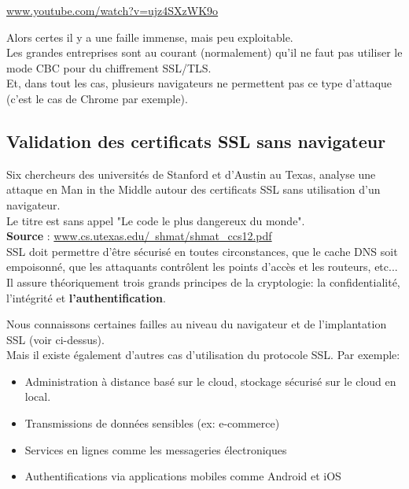 \documentclass{article}
\begin{document}
	\href{http://www.youtube.com/watch?v=ujz4SXzWK9o}
	{www.youtube.com/watch?v=ujz4SXzWK9o}
	
	Alors certes il y a une faille immense, mais peu exploitable.\\
	Les grandes entreprises sont au courant (normalement) qu'il ne faut
	pas utiliser le mode CBC pour du chiffrement SSL/TLS.\\
	Et, dans tout les cas, plusieurs navigateurs ne permettent pas ce
	type d'attaque (c'est le cas de Chrome par exemple).\\
	
	
	
	\subsection{Validation des certificats SSL sans navigateur}	
	
	Six chercheurs des universités de Stanford et d'Austin au Texas, 
	analyse une attaque en Man in the Middle autour des certificats
	SSL sans utilisation d'un navigateur.\\
	
	Le titre est sans appel "Le code le plus dangereux du monde".\\
	
	\textbf{Source} :
	\href{http://www.cs.utexas.edu/~shmat/shmat_ccs12.pdf}
	{www.cs.utexas.edu/~shmat/shmat\_ccs12.pdf}\\
	
	SSL doit permettre d'être sécurisé en toutes circonstances, que le
	cache DNS soit empoisonné, que les attaquants contrôlent les
	points d'accès et les routeurs, etc...\\
	
	Il assure théoriquement trois grands principes de la
	cryptologie: la confidentialité, l'intégrité et
	\textbf{l'authentification}.

	Nous connaissons certaines failles au niveau du navigateur et de
	l'implantation SSL (voir ci-dessus).\\
	
	Mais il existe également d'autres cas d'utilisation du protocole SSL.
	Par exemple:
	\begin{itemize}
	\item Administration à distance basé sur le cloud, stockage 
	sécurisé sur le cloud en local.
	\item Transmissions de données sensibles (ex: e-commerce)
	\item Services en lignes comme les messageries électroniques
	\item Authentifications via applications mobiles comme Android et iOS
	\end{itemize}
	
\end{document}
